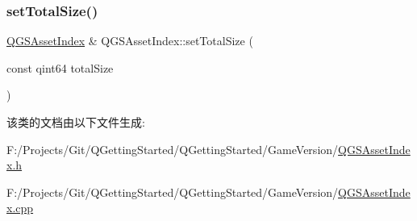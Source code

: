 \mbox{\label{class_q_g_s_asset_index_ad5f60616a920c9988ef6c18598dc8b6c}} 
\subsubsection{\texorpdfstring{set\+Total\+Size()}{setTotalSize()}}
{\footnotesize\ttfamily \mbox{\hyperlink{class_q_g_s_asset_index}{Q\+G\+S\+Asset\+Index}} \& Q\+G\+S\+Asset\+Index\+::set\+Total\+Size (\begin{DoxyParamCaption}\item[{const qint64}]{total\+Size }\end{DoxyParamCaption})}



该类的文档由以下文件生成\+:\begin{DoxyCompactItemize}
\item 
F\+:/\+Projects/\+Git/\+Q\+Getting\+Started/\+Q\+Getting\+Started/\+Game\+Version/\mbox{\hyperlink{_q_g_s_asset_index_8h}{Q\+G\+S\+Asset\+Index.\+h}}\item 
F\+:/\+Projects/\+Git/\+Q\+Getting\+Started/\+Q\+Getting\+Started/\+Game\+Version/\mbox{\hyperlink{_q_g_s_asset_index_8cpp}{Q\+G\+S\+Asset\+Index.\+cpp}}\end{DoxyCompactItemize}
